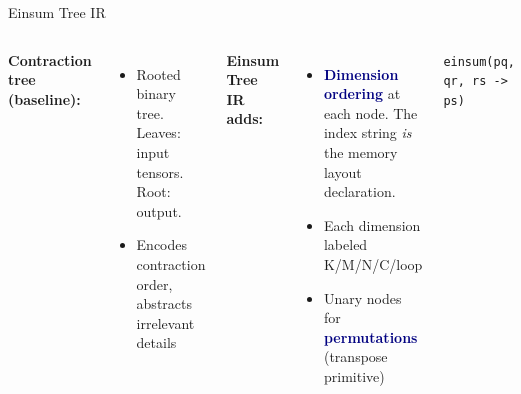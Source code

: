 \documentclass[aspectratio=169,10pt]{beamer}
\newcommand{\ein}[1]{{\small\texttt{#1}}}
\newcommand{\einl}[1]{{\footnotesize\texttt{#1}}}
\begin{document}
\begin{frame}{Einsum Tree IR}

\begin{columns}[T]
\textbf{Contraction tree (baseline):}
\begin{itemize}
  \item Rooted binary tree. Leaves: input tensors. Root: output.
  \item Encodes contraction order, abstracts irrelevant details
\end{itemize}

\medskip
\textbf{Einsum Tree IR adds:}
\begin{itemize}
  \item \textcolor{Navy}{\bfseries Dimension ordering} at each node.
        The index string \emph{is} the memory layout declaration.
  \item Each dimension labeled K/M/N/C/loop
  \item Unary nodes for \textcolor{Navy}{\bfseries permutations} (transpose primitive)
\end{itemize}

\begin{center}

\smallskip
{\footnotesize\einl{einsum(pq, qr, rs -> ps)}}
\end{center}
\end{columns}
\end{frame}
\end{document}
